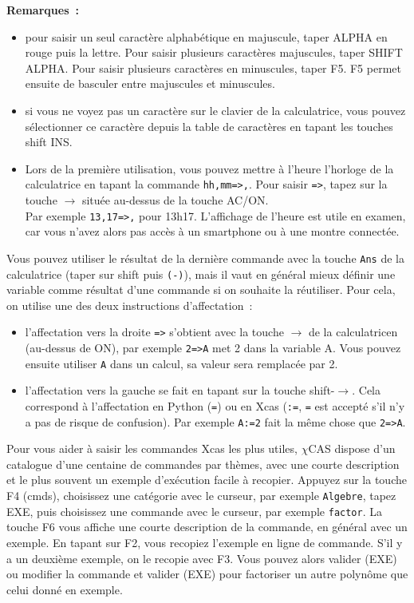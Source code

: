 \documentclass{article}
\begin{document}
\begin{giacjshere}
{\bf Remarques~:}
\begin{itemize}
\item pour saisir un seul caract\`ere alphab\'etique en majuscule,
taper ALPHA en rouge puis la lettre. Pour saisir plusieurs caract\`eres
majuscules, taper SHIFT ALPHA. Pour saisir plusieurs caract\`eres en
minuscules, taper F5. F5 permet ensuite de basculer entre majuscules
et minuscules.
\item si vous ne voyez pas un caractère sur le clavier de
la calculatrice, vous pouvez sélectionner ce caractère depuis
la table de caractères en tapant les touches shift INS.
\item Lors de la premi\`ere utilisation, vous pouvez mettre \`a l'heure
l'horloge de la calculatrice en tapant la
commande \verb|hh,mm=>,|.
Pour saisir \verb|=>|, tapez sur la touche $\rightarrow$
située au-dessus de la touche AC/ON.\\
Par exemple \verb|13,17=>,| pour 13h17.
L'affichage de l'heure est utile en examen, car vous n'avez 
alors pas accès à un smartphone ou à une montre connectée.
\end{itemize}

Vous pouvez utiliser le r\'esultat de la derni\`ere commande
avec la touche \verb|Ans| de la calculatrice (taper sur shift 
puis \verb|(-)|),
mais il vaut en g\'en\'eral mieux d\'efinir une variable comme r\'esultat 
d'une commande si on souhaite la r\'eutiliser. Pour cela, on
utilise une des deux instructions d'affectation~:
\begin{itemize}
\item l'affectation vers la droite \verb|=>| s'obtient avec la 
touche $\rightarrow$ de la 
calculatricen (au-dessus de ON), 
par exemple \verb|2=>A| met 2 dans la variable A.
Vous pouvez ensuite utiliser \verb|A| dans un calcul, sa
valeur sera remplac\'ee par 2.
\item l'affectation vers la gauche se fait en tapant sur la touche
shift-$\rightarrow$.
Cela correspond \`a l'affectation en
Python (\verb|=|) ou en Xcas (\verb|:=|, \verb|=|
est accept\'e s'il n'y a pas de risque de confusion).
Par exemple \verb|A:=2| fait la m\^eme chose que \verb|2=>A|.
\end{itemize}

Pour vous aider \`a saisir les commandes Xcas les plus utiles,
$\chi$CAS dispose d'un catalogue d'une centaine de commandes
par thèmes,
avec une courte description et le plus souvent un exemple 
d'ex\'ecution facile \`a recopier. 
Appuyez sur la touche F4 (cmds), choisissez une cat\'egorie avec le curseur, 
par exemple \verb|Algebre|, tapez EXE,
puis choisissez une commande avec le curseur, par exemple \verb|factor|.
La touche F6 vous affiche une courte description de la commande,
en g\'en\'eral avec un exemple. En tapant sur F2, vous recopiez
l'exemple en ligne de commande. S'il y a un deuxi\`eme exemple,
on le recopie avec F3. Vous pouvez alors valider (EXE) ou
modifier la commande et valider (EXE) 
pour factoriser un autre polyn\^ome que celui
donn\'e en exemple.


\end{giacjshere}
\end{document}
